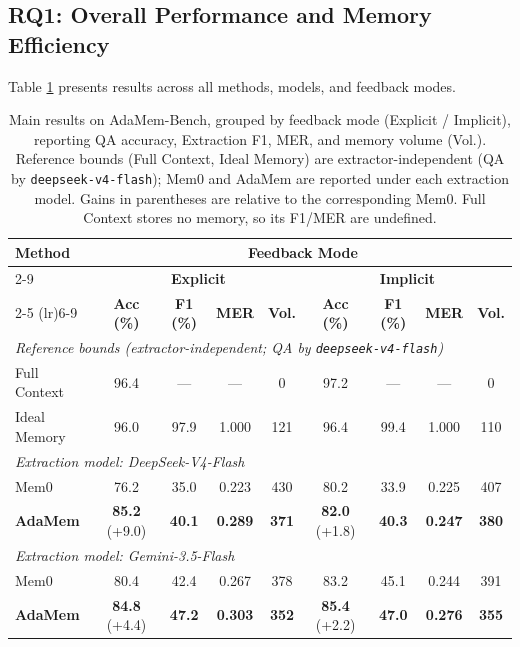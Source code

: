 \documentclass[11pt]{article}
\begin{document}
\subsection{RQ1: Overall Performance and Memory Efficiency}
Table \ref{tab:main_results} presents results across all methods, models, and feedback modes.

\begin{table}[t]
\centering
\small
\begin{tabular}{lcccccccc}
\toprule
\multirow{3}{*}{\textbf{Method}} & \multicolumn{8}{c}{\textbf{Feedback Mode}} \\
\cmidrule(lr){2-9}
& \multicolumn{4}{c}{\textbf{Explicit}} & \multicolumn{4}{c}{\textbf{Implicit}} \\
\cmidrule(lr){2-5} \cmidrule(lr){6-9}
& \textbf{Acc (\%)} & \textbf{F1 (\%)} & \textbf{MER} & \textbf{Vol.} & \textbf{Acc (\%)} & \textbf{F1 (\%)} & \textbf{MER} & \textbf{Vol.} \\
\midrule
\multicolumn{9}{l}{\textit{Reference bounds (extractor-independent; QA by \texttt{deepseek-v4-flash})}} \\
Full Context & 96.4 & --- & --- & 0 & 97.2 & --- & --- & 0 \\
Ideal Memory & 96.0 & 97.9 & 1.000 & 121 & 96.4 & 99.4 & 1.000 & 110 \\
\midrule
\multicolumn{9}{l}{\textit{Extraction model: DeepSeek-V4-Flash}} \\
Mem0 & 76.2 & 35.0 & 0.223 & 430 & 80.2 & 33.9 & 0.225 & 407 \\
\textbf{AdaMem} & \textbf{85.2} \scriptsize{(+9.0)} & \textbf{40.1} & \textbf{0.289} & \textbf{371} & \textbf{82.0} \scriptsize{(+1.8)} & \textbf{40.3} & \textbf{0.247} & \textbf{380} \\
\midrule
\multicolumn{9}{l}{\textit{Extraction model: Gemini-3.5-Flash}} \\
Mem0 & 80.4 & 42.4 & 0.267 & 378 & 83.2 & 45.1 & 0.244 & 391 \\
\textbf{AdaMem} & \textbf{84.8} \scriptsize{(+4.4)} & \textbf{47.2} & \textbf{0.303} & \textbf{352} & \textbf{85.4} \scriptsize{(+2.2)} & \textbf{47.0} & \textbf{0.276} & \textbf{355} \\
\bottomrule
\end{tabular}
\caption{Main results on AdaMem-Bench, grouped by feedback mode (Explicit / Implicit), reporting QA accuracy, Extraction F1, MER, and memory volume (Vol.). Reference bounds (Full Context, Ideal Memory) are extractor-independent (QA by \texttt{deepseek-v4-flash}); Mem0 and AdaMem are reported under each extraction model. Gains in parentheses are relative to the corresponding Mem0. Full Context stores no memory, so its F1/MER are undefined.}
\label{tab:main_results}
\end{table}
\end{document}
